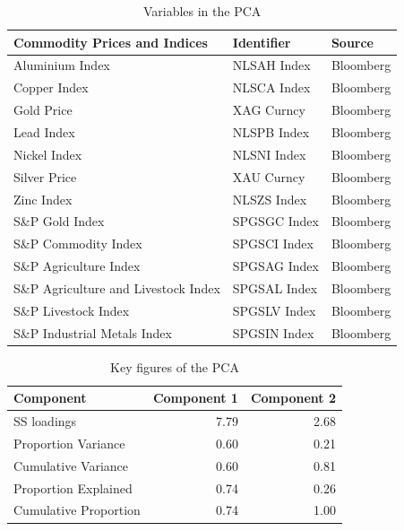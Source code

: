 \documentclass[12pt,]{article}
\begin{document}
\begin{table}

\caption{\label{tab:unnamed-chunk-6}Variables in the PCA}
\centering
\begin{tabular}[t]{l|l|l}
\hline
Commodity Prices and Indices & Identifier & Source\\
\hline
Aluminium Index & NLSAH Index & Bloomberg\\
\hline
Copper Index & NLSCA Index & Bloomberg\\
\hline
Gold Price & XAG Curncy & Bloomberg\\
\hline
Lead Index & NLSPB Index & Bloomberg\\
\hline
Nickel Index & NLSNI Index & Bloomberg\\
\hline
Silver Price & XAU Curncy & Bloomberg\\
\hline
Zinc Index & NLSZS Index & Bloomberg\\
\hline
S\&P Gold Index & SPGSGC Index & Bloomberg\\
\hline
S\&P Commodity Index & SPGSCI Index & Bloomberg\\
\hline
S\&P Agriculture Index & SPGSAG Index & Bloomberg\\
\hline
S\&P Agriculture and Livestock Index & SPGSAL Index & Bloomberg\\
\hline
S\&P Livestock Index & SPGSLV Index & Bloomberg\\
\hline
S\&P Industrial Metals Index & SPGSIN Index & Bloomberg\\
\hline
\end{tabular}
\end{table}

\begin{table}

\caption{\label{tab:unnamed-chunk-7}Key figures of the PCA}
\centering
\begin{tabular}[t]{l|r|r}
\hline
Component & Component 1 & Component 2\\
\hline
SS loadings & 7.79 & 2.68\\
\hline
Proportion Variance & 0.60 & 0.21\\
\hline
Cumulative Variance & 0.60 & 0.81\\
\hline
Proportion Explained & 0.74 & 0.26\\
\hline
Cumulative Proportion & 0.74 & 1.00\\
\hline
\end{tabular}
\end{table}
\end{document}
